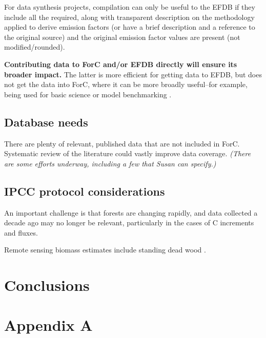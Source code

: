 \documentclass[, manuscript]{copernicus}
\begin{document}
For data synthesis projects, compilation can only be useful to the EFDB
if they include all the required, along with transparent description on
the methodology applied to derive emission factors (or have a brief
description and a reference to the original source) and the original
emission factor values are present (not modified/rounded).

\textbf{Contributing data to ForC and/or EFDB directly will ensure its
broader impact.} The latter is more efficient for getting data to EFDB,
but does not get the data into ForC, where it can be more broadly
useful--for example, being used for basic science
\citep[e.g.,][]{banburymorgan_global_2021, anderson-teixeira_carbon_2021}
or model benchmarking \citep{fer_ecosystem_2021}.

\subsection{Database needs}

There are plenty of relevant, published data that are not included in
ForC. Systematic review of the literature could vastly improve data
coverage. \emph{(There are some efforts underway, including a few that
Susan can specify.)}

\subsection{IPCC protocol considerations}

An important challenge is that forests are changing rapidly, and data
collected a decade ago may no longer be relevant, particularly in the
cases of C increments and fluxes.

Remote sensing biomass estimates include standing dead wood
\citep{duncanson_aboveground_2021}.

\section{Conclusions}

\clearpage

\section{Appendix A}
\end{document}

